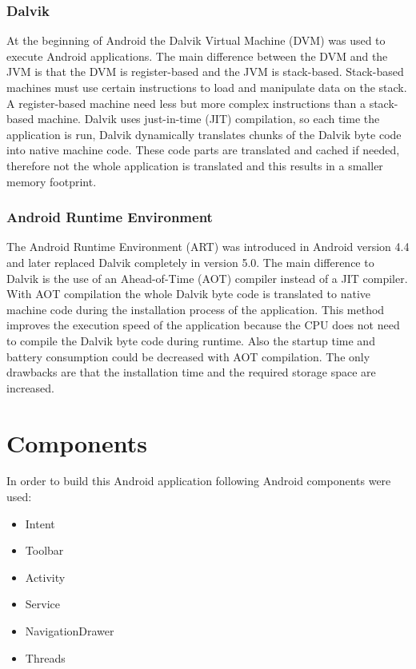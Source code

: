 	\subsubsection{Dalvik}
	At the beginning of Android the Dalvik Virtual Machine (DVM) was used to execute Android applications. The main difference between the DVM and the JVM is that the DVM is register-based and the JVM is stack-based. Stack-based machines must use certain instructions to load and manipulate data on the stack. A register-based machine need less but more complex instructions than a stack-based machine. Dalvik uses just-in-time (JIT) compilation, so each time the application is run, Dalvik dynamically translates chunks of the Dalvik byte code into native machine code. These code parts are translated and cached if needed, therefore not the whole application is translated and this results in a smaller memory footprint.

	\subsubsection{Android Runtime Environment}
	The Android Runtime Environment (ART) was introduced in Android version 4.4 and later replaced Dalvik completely in version 5.0. The main difference to Dalvik is the use of an Ahead-of-Time (AOT) compiler instead of a JIT compiler. With AOT compilation the whole Dalvik byte code is translated to native machine code during the installation process of the application. This method improves the execution speed of the application because the CPU does not need to compile the Dalvik byte code during runtime. Also the startup time and battery consumption could be decreased with AOT compilation. The only drawbacks are that the installation time and the required storage space are increased.

\section{Components}
In order to build this Android application following Android components were used:

\begin{itemize}
	\item Intent
	\item Toolbar
	\item Activity
	\item Service
	\item NavigationDrawer
	\item Threads
\end{itemize}

